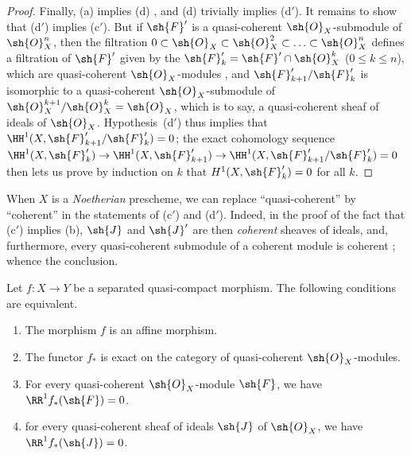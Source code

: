 \begin{proof}
Finally, (a) implies (d) , and (d) trivially implies (d$'$).
It remains to show that (d$'$) implies (c$'$).
But if $\sh{F}'$ is a quasi-coherent $\sh{O}_X$-submodule of $\sh{O}_X^n$, then the filtration $0\subset\sh{O}_X\subset\sh{O}_X^2\subset\ldots\subset\sh{O}_X^n$ defines a filtration of $\sh{F}'$ given by the $\sh{F}'_k=\sh{F}'\cap\sh{O}_X^k$ ($0\leq k\leq n$), which are quasi-coherent $\sh{O}_X$-modules , and $\sh{F}'_{k+1}/\sh{F}'_k$ is isomorphic to a quasi-coherent $\sh{O}_X$-submodule of $\sh{O}_X^{k+1}/\sh{O}_X^k=\sh{O}_X$, which is to say, a quasi-coherent sheaf of ideals of $\sh{O}_X$.
Hypothesis~(d$'$) thus implies that $\HH^1(X,\sh{F}'_{k+1}/\sh{F}'_k)=0$;
the exact cohomology sequence $\HH^1(X,\sh{F}'_k)\to\HH^1(X,\sh{F}'_{k+1})\to\HH^1(X,\sh{F}'_{k+1}/\sh{F}'_k)=0$ then lets us prove by induction on $k$ that $H^1(X,\sh{F}'_k)=0$ for all $k$.
\end{proof}

\begin{remark}[5.2.1.1]
\label{II.5.2.1.1}
When $X$ is a \emph{Noetherian} prescheme, we can replace ``quasi-coherent'' by ``coherent'' in the statements of (c$'$) and (d$'$).
Indeed, in the proof of the fact that (c$'$) implies (b), $\sh{J}$ and $\sh{J}'$ are then \emph{coherent} sheaves of ideals, and, furthermore, every quasi-coherent submodule of a coherent module is coherent ;
whence the conclusion.
\end{remark}

\begin{corollary}[5.2.2]
\label{II.5.2.2}
Let $f:X\to Y$ be a separated quasi-compact morphism.
The following conditions are equivalent.
\begin{enumerate}
  \item[{\rm(a)}] The morphism $f$ is an affine morphism.
  \item[{\rm(b)}] The functor $f_*$ is exact on the category of quasi-coherent $\sh{O}_X$-modules.
  \item[{\rm(c)}] For every quasi-coherent $\sh{O}_X$-module $\sh{F}$, we have $\RR^1 f_*(\sh{F})=0$.
  \item[{\rm(c')}] for every quasi-coherent sheaf of ideals $\sh{J}$ of $\sh{O}_X$, we have $\RR^1 f_*(\sh{J})=0$.
\end{enumerate}
\end{corollary}


